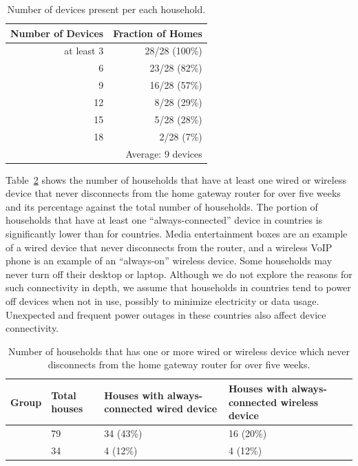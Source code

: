 \begin{table}[t]
\small
\begin{tabular}{ |r|r| }
  \hline
  {\bf Number of Devices} & {\bf Fraction of Homes} \\
  \hline
  at least 3 & 28/28 (100\%) \\
  6 & 23/28 (82\%) \\
  9 & 16/28 (57\%) \\
  12 & 8/28 (29\%) \\
  15 & 5/28 (28\%) \\
  18 & 2/28 (7\%) \\
  \hline
\multicolumn{2}{|r|}{Average: 9 devices} \\
  \hline
\end{tabular}
\centering\caption{Number of devices present per each
  household. }
\label{tab:countofdevices}
\end{table}
\fi

Table~\ref{tab:always-conn} shows the number of households that have at least
one wired or wireless device that never disconnects from the home gateway router
for over five weeks and its percentage against the total number of households.
The portion of households that have at least one ``always-connected'' device in
\developing{} countries is significantly lower than for \developed{} countries.
Media entertainment boxes are an example of a wired device that
never disconnects from the router, and a wireless VoIP phone is an
example of an ``always-on'' wireless device.  Some households may never
turn off their desktop or laptop.
Although we do not explore the reasons for such connectivity in depth,
we assume that households in \developing{} countries tend to power off devices
when not in use, possibly to minimize electricity 
or data usage.  Unexpected and frequent power
outages in these countries also affect device connectivity.
\begin{table}[t]
\small
\begin{tabular}{m{}|m{}|m{}|m{}}
{\bf Group} & {\bf Total houses} & {\bf Houses with always-connected wired device} & {\bf Houses with always-connected wireless device}\\
\hline
{\developed{}} & {79} & {34 (43\%)} & {16 (20\%)}\\
{\developing{}} & {34} & {4 (12\%)} & {4 (12\%)}\\
\end{tabular}
\centering\caption{Number of households that has one or more wired or wireless device which
never disconnects from the home gateway router for over five weeks.}
\label{tab:always-conn}
\end{table}




